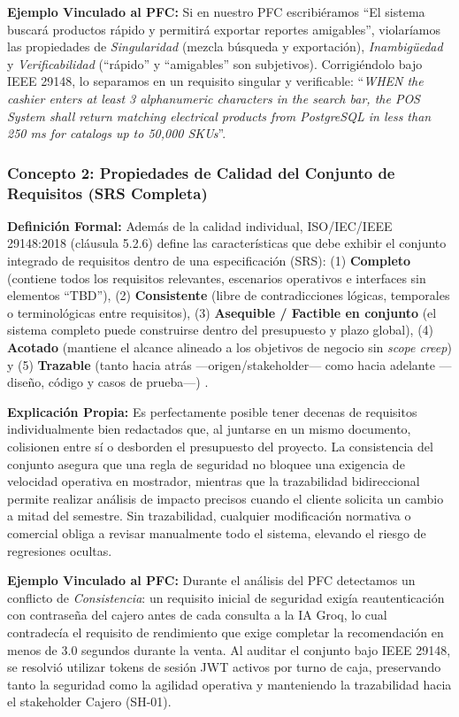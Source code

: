 \textbf{Ejemplo Vinculado al PFC:} Si en nuestro PFC escribiéramos ``El sistema buscará productos rápido y permitirá exportar reportes amigables'', violaríamos las propiedades de \textit{Singularidad} (mezcla búsqueda y exportación), \textit{Inambigüedad} y \textit{Verificabilidad} (``rápido'' y ``amigables'' son subjetivos). Corrigiéndolo bajo IEEE 29148, lo separamos en un requisito singular y verificable: ``\textit{WHEN the cashier enters at least 3 alphanumeric characters in the search bar, the POS System shall return matching electrical products from PostgreSQL in less than 250 ms for catalogs up to 50,000 SKUs}''.

\subsubsection{Concepto 2: Propiedades de Calidad del Conjunto de Requisitos (SRS Completa)}
\textbf{Definición Formal:} Además de la calidad individual, ISO/IEC/IEEE 29148:2018 (cláusula 5.2.6) define las características que debe exhibir el conjunto integrado de requisitos dentro de una especificación (SRS): (1) \textbf{Completo} (contiene todos los requisitos relevantes, escenarios operativos e interfaces sin elementos ``TBD''), (2) \textbf{Consistente} (libre de contradicciones lógicas, temporales o terminológicas entre requisitos), (3) \textbf{Asequible / Factible en conjunto} (el sistema completo puede construirse dentro del presupuesto y plazo global), (4) \textbf{Acotado} (mantiene el alcance alineado a los objetivos de negocio sin \textit{scope creep}) y (5) \textbf{Trazable} (tanto hacia atrás —origen/stakeholder— como hacia adelante —diseño, código y casos de prueba—) \cite{ieee29148, swebok2024}.

\textbf{Explicación Propia:} Es perfectamente posible tener decenas de requisitos individualmente bien redactados que, al juntarse en un mismo documento, colisionen entre sí o desborden el presupuesto del proyecto. La consistencia del conjunto asegura que una regla de seguridad no bloquee una exigencia de velocidad operativa en mostrador, mientras que la trazabilidad bidireccional permite realizar análisis de impacto precisos cuando el cliente solicita un cambio a mitad del semestre. Sin trazabilidad, cualquier modificación normativa o comercial obliga a revisar manualmente todo el sistema, elevando el riesgo de regresiones ocultas.

\textbf{Ejemplo Vinculado al PFC:} Durante el análisis del PFC detectamos un conflicto de \textit{Consistencia}: un requisito inicial de seguridad exigía reautenticación con contraseña del cajero antes de cada consulta a la IA Groq, lo cual contradecía el requisito de rendimiento que exige completar la recomendación en menos de 3.0 segundos durante la venta. Al auditar el conjunto bajo IEEE 29148, se resolvió utilizar tokens de sesión JWT activos por turno de caja, preservando tanto la seguridad como la agilidad operativa y manteniendo la trazabilidad hacia el stakeholder Cajero (SH-01).


